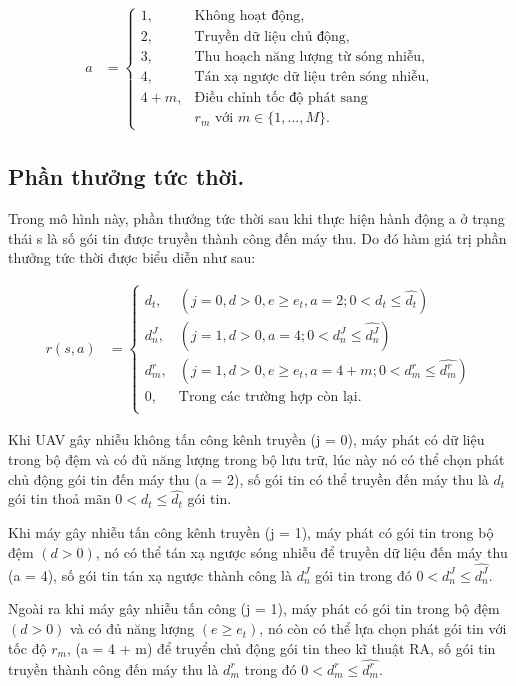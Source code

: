 \documentclass{uetgraduation}
\begin{document}
\begin{align*}
    a &= \begin{cases}
        1, & \text{Không hoạt động,} \\
        2, & \text{Truyền dữ liệu chủ động,} \\
        3, & \text{Thu hoạch năng lượng từ sóng nhiễu,} \\
        4, & \text{Tán xạ ngược dữ liệu trên sóng nhiễu,} \\
        4 + m, & \text{Điều chỉnh tốc độ phát sang } \\
                & r_m \text{ với } m \in \{1, \ldots, M\}.
    \end{cases}
\end{align*}

\subsection{Phần thưởng tức thời.}
Trong mô hình này, phần thưởng tức thời sau khi thực hiện hành động a ở trạng thái s là số gói tin được truyền thành công đến máy thu. Do đó hàm giá
trị phần thưởng tức thời được biểu diễn như sau:

\begin{align*}
    r(s,a) &= \begin{cases}
        d_t, & (j = 0, d > 0, e \geq e_t, a = 2; 0 < d_t \leq \hat{d_t}) \\
        d_n^J, & (j = 1, d > 0, a = 4; 0 < d_n^J \leq \hat{d_n^J}) \\
        d_m^r, & (j = 1, d > 0, e \geq e_t, a = 4 + m; 0 < d_m^r \leq \hat{d_m^r}) \\
        0, & \text{Trong các trường hợp còn lại.} \\
    \end{cases}
\end{align*}

Khi UAV gây nhiễu không tấn công kênh truyền (j = 0), máy phát có dữ liệu trong bộ đệm và có đủ năng lượng trong bộ lưu trữ, lúc này nó có thể chọn phát
chủ động gói tin đến máy thu (a = 2), số gói tin có thể truyền đến máy thu là $d_t$ gói tin thoả mãn $0 < d_t \leq \hat{d_t}$ gói tin.

Khi máy gây nhiễu tấn công kênh truyền (j = 1), máy phát có gói tin trong bộ đệm $(d > 0)$, nó có thể tán xạ ngược sóng nhiễu để truyền dữ liệu đến máy thu (a = 4), 
số gói tin tán xạ ngược thành công là $d_n^J$ gói tin trong đó $0 < d_n^J \leq \hat{d_n^J}$.

Ngoài ra khi máy gây nhiễu tấn công (j = 1), máy phát có gói tin trong bộ đệm $(d > 0)$ và có đủ năng lượng $(e \geq e_t)$, nó còn có thể lựa chọn phát gói 
tin với tốc độ $r_m$, (a = 4 + m) để truyển chủ động gói tin theo kĩ thuật RA, số gói tin truyền thành công đến máy thu là $d_m^r$ trong đó $0 < d_m^r \leq \hat{d_m^r}$.
\end{document}
